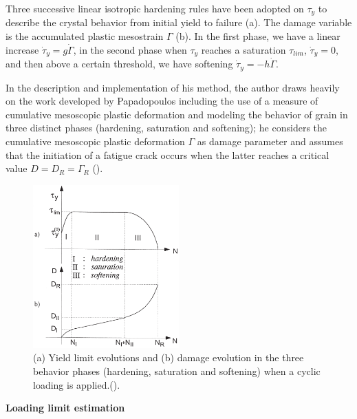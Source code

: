 Three successive linear isotropic hardening rules have
been adopted on $\tau_y$ to describe the crystal behavior from
initial yield to failure (a). The damage variable is the accumulated plastic mesostrain $\Gamma$ (b).
In the first phase, we have a linear increase $\dot{\tau}_y=g\dot{\Gamma}$, in the second phase when $\tau_y$ reaches a saturation $\tau_{lim}$, $\dot{\tau}_y=0$, and then above a certain threshold, we have softening $\dot{\tau}_y=-h\dot{\Gamma}$.

In the description and implementation of his method, the author draws heavily on the work developed by Papadopoulos including the use of a measure of cumulative mesoscopic plastic deformation   and modeling the behavior of grain in three distinct phases (hardening, saturation and softening); he considers the cumulative mesoscopic plastic deformation $\Gamma$ as damage parameter and assumes that the initiation of a fatigue crack occurs when the latter reaches a
critical value $D = D_R = \Gamma_R$ (). 
\begin{figure}[h!]
	\centering
	\includegraphics[width=0.5\textwidth]{figures//3phases.png} 
	\caption{(a) Yield limit evolutions and (b) damage evolution in the three behavior phases (hardening, saturation and softening) when a cyclic loading is applied.(\cite{Morel2000101}).}
	\label{3phases}
\end{figure}

\textbf{Loading limit estimation}

